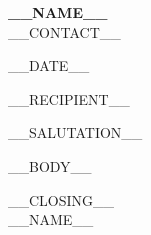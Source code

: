 \documentclass[11pt]{article}
\begin{document}
{\LARGE\bfseries __NAME__}\\[2pt]
{\small\color{gray}__CONTACT__}

\vspace{12pt}
__DATE__

\vspace{6pt}
__RECIPIENT__

\vspace{10pt}
__SALUTATION__

\vspace{4pt}
__BODY__

\vspace{12pt}
__CLOSING__\\
__NAME__
\end{document}
